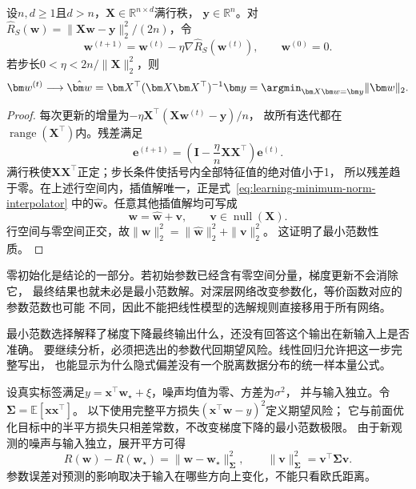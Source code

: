 \begin{theorem}[梯度下降的最小范数选择]
\label{thm:learning-gradient-descent-minimum-norm}
设$n,d\geq1$且$d>n$，$\bm X\in\mathbb R^{n\times d}$满行秩，
$\bm y\in\mathbb R^n$。对
$\hat R_S(\bm w)=\|\bm X\bm w-\bm y\|_2^2/(2n)$，令
\[
 \bm w^{(t+1)}=\bm w^{(t)}-\eta\nabla\hat R_S(\bm w^{(t)}),
 \qquad \bm w^{(0)}=0.
\]
若步长$0<\eta<2n/\|\bm X\|_2^2$，则
\begin{equation}
 \bm w^{(t)}\longrightarrow\hat{\bm w}
 =\bm X^\top(\bm X\bm X^\top)^{-1}\bm y
 =\argmin_{\bm X\bm w=\bm y}\|\bm w\|_2.
 \label{eq:learning-minimum-norm-interpolator}
\end{equation}
\end{theorem}
\begin{proof}
每次更新的增量为$-\eta\bm X^\top(\bm X\bm w^{(t)}-\bm y)/n$，
故所有迭代都在$\operatorname{range}(\bm X^\top)$内。残差满足
\[
 \bm e^{(t+1)}=
 \left(\bm I-\frac\eta n\bm X\bm X^\top\right)\bm e^{(t)}.
\]
满行秩使$\bm X\bm X^\top$正定；步长条件使括号内全部特征值的绝对值小于1，
所以残差趋于零。在上述行空间内，插值解唯一，正是式~\eqref{eq:learning-minimum-norm-interpolator}
中的$\hat{\bm w}$。任意其他插值解均可写成
\begin{equation}
 \bm w=\hat{\bm w}+\bm v,\qquad\bm v\in\operatorname{null}(\bm X).
 \label{eq:learning-interpolator-decomposition}
\end{equation}
行空间与零空间正交，故$\|\bm w\|_2^2=\|\hat{\bm w}\|_2^2+\|\bm v\|_2^2$。
这证明了最小范数性质。
\end{proof}

零初始化是结论的一部分。若初始参数已经含有零空间分量，梯度更新不会消除它，
最终结果也就未必是最小范数解。对深层网络改变参数化，等价函数对应的参数范数也可能
不同，因此不能把线性模型的选解规则直接移用于所有网络。

最小范数选择解释了梯度下降最终输出什么，还没有回答这个输出在新输入上是否准确。
要继续分析，必须把选出的参数代回期望风险。线性回归允许把这一步完整写出，
也能显示为什么隐式偏差没有一个脱离数据分布的统一样本量公式。

设真实标签满足$y=\bm x^\top\bm w_\star+\xi$，噪声均值为零、方差为$\sigma^2$，
并与输入独立。令$\bm\Sigma=\mathbb E[\bm x\bm x^\top]$。
以下使用完整平方损失$(\bm x^\top\bm w-y)^2$定义期望风险；
它与前面优化目标中的半平方损失只相差常数，不改变梯度下降的最小范数极限。
由于新观测的噪声与输入独立，展开平方可得
\[
 R(\bm w)-R(\bm w_\star)
 =\|\bm w-\bm w_\star\|_{\bm\Sigma}^2,
 \qquad\|\bm v\|_{\bm\Sigma}^2=\bm v^\top\bm\Sigma\bm v.
\]
参数误差对预测的影响取决于输入在哪些方向上变化，不能只看欧氏距离。

